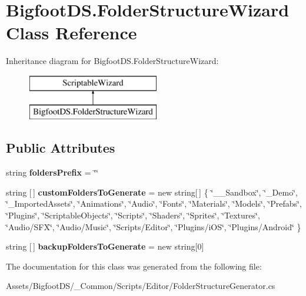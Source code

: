 \hypertarget{class_bigfoot_d_s_1_1_folder_structure_wizard}{}\section{Bigfoot\+D\+S.\+Folder\+Structure\+Wizard Class Reference}
\label{class_bigfoot_d_s_1_1_folder_structure_wizard}
Inheritance diagram for Bigfoot\+D\+S.\+Folder\+Structure\+Wizard\+:\begin{figure}[H]
\begin{center}
\leavevmode
\includegraphics[height=2.000000cm]{class_bigfoot_d_s_1_1_folder_structure_wizard}
\end{center}
\end{figure}
\subsection*{Public Attributes}
\begin{DoxyCompactItemize}
\item 
\mbox{\label{class_bigfoot_d_s_1_1_folder_structure_wizard_a50ea0ecdc934635b543b889f9b3a3137}} 
string {\bfseries folders\+Prefix} = \char`\"{}\char`\"{}
\item 
\mbox{\label{class_bigfoot_d_s_1_1_folder_structure_wizard_a0d8cee92696e97b34af579efaae02ce6}} 
string \mbox{[}$\,$\mbox{]} {\bfseries custom\+Folders\+To\+Generate} = new string\mbox{[}$\,$\mbox{]} \{ \char`\"{}\+\_\+\+\_\+\+Sandbox\char`\"{}, \char`\"{}\+\_\+\+Demo\char`\"{}, \char`\"{}\+\_\+\+Imported\+Assets\char`\"{}, \char`\"{}Animations\char`\"{}, \char`\"{}Audio\char`\"{}, \char`\"{}Fonts\char`\"{}, \char`\"{}Materials\char`\"{}, \char`\"{}Models\char`\"{}, \char`\"{}Prefabs\char`\"{}, \char`\"{}Plugins\char`\"{}, \char`\"{}Scriptable\+Objects\char`\"{}, \char`\"{}Scripts\char`\"{}, \char`\"{}Shaders\char`\"{}, \char`\"{}Sprites\char`\"{}, \char`\"{}Textures\char`\"{}, \char`\"{}Audio/S\+FX\char`\"{}, \char`\"{}Audio/Music\char`\"{}, \char`\"{}Scripts/Editor\char`\"{}, \char`\"{}Plugins/i\+OS\char`\"{}, \char`\"{}Plugins/Android\char`\"{} \}
\item 
\mbox{\label{class_bigfoot_d_s_1_1_folder_structure_wizard_a1385e0b34ea11fe34b3fdd988f9e221d}} 
string \mbox{[}$\,$\mbox{]} {\bfseries backup\+Folders\+To\+Generate} = new string\mbox{[}0\mbox{]}
\end{DoxyCompactItemize}


The documentation for this class was generated from the following file\+:\begin{DoxyCompactItemize}
\item 
Assets/\+Bigfoot\+D\+S/\+\_\+\+Common/\+Scripts/\+Editor/Folder\+Structure\+Generator.\+cs\end{DoxyCompactItemize}
